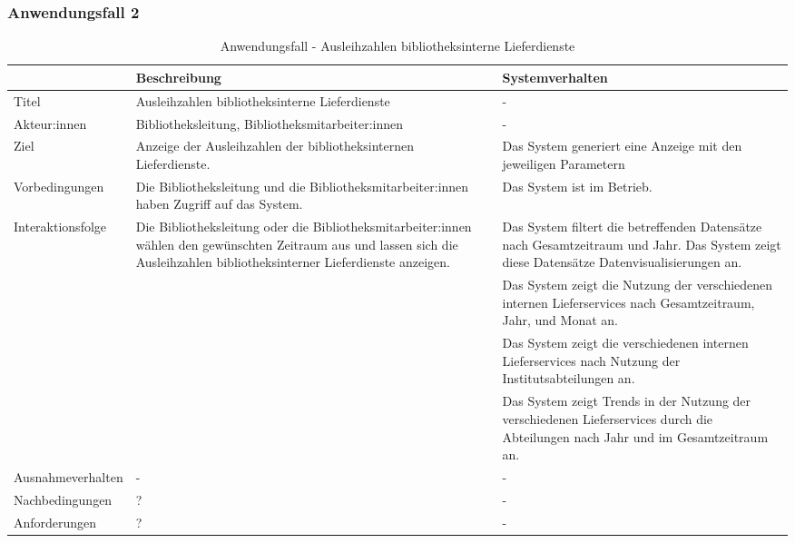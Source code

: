 \subsubsection{Anwendungsfall 2}

\begingroup
\setlength{\tabcolsep}{10pt} %
\renewcommand{\arraystretch}{1.25} 
\begin{table}[H]
    \centering
    \begin{adjustbox}{max width=\textwidth}
    \begin{tabular}{lp{7.0cm}p{7.0cm}}
       \toprule
       \textbf{}          & \textbf{Beschreibung} &\textbf{Systemverhalten}\\
       \midrule
        Titel                            &Ausleihzahlen bibliotheksinterne Lieferdienste& -\\
        Akteur:innen                     &Bibliotheksleitung, Bibliotheksmitarbeiter:innen& -\\
        Ziel                             &Anzeige der Ausleihzahlen der bibliotheksinternen Lieferdienste.& Das System generiert eine Anzeige mit den jeweiligen Parametern\\
        Vorbedingungen                   &Die Bibliotheksleitung und die Bibliotheksmitarbeiter:innen haben Zugriff auf das System.& Das System ist im Betrieb.\\
        Interaktionsfolge                &Die Bibliotheksleitung oder die Bibliotheksmitarbeiter:innen wählen den gewünschten Zeitraum aus und lassen sich die Ausleihzahlen bibliotheksinterner Lieferdienste anzeigen. & Das System filtert die betreffenden Datensätze nach Gesamtzeitraum und Jahr. Das System zeigt diese Datensätze Datenvisualisierungen an.\\
                                        & &Das System zeigt die Nutzung der verschiedenen internen Lieferservices nach Gesamtzeitraum, Jahr, und Monat an.\\
                                        & &Das System zeigt die verschiedenen internen Lieferservices nach Nutzung der Institutsabteilungen an.\\
                                        & &Das System zeigt Trends in der Nutzung der verschiedenen Lieferservices  durch die Abteilungen nach Jahr und im Gesamtzeitraum an.\\
        Ausnahmeverhalten               &- & -\\
        Nachbedingungen                 &?& -\\

        Anforderungen                   &?& -\\
        \bottomrule
    \end{tabular}
    \end{adjustbox}
    \caption{%
    Anwendungsfall - Ausleihzahlen bibliotheksinterne Lieferdienste
    }
    \label{tab:AF_Lieferdienste}
    \end{table}
\endgroup

